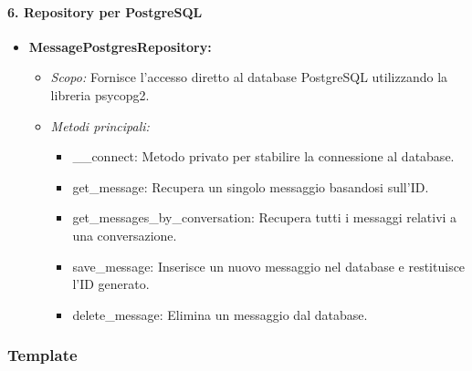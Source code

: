     \paragraph{6. Repository per PostgreSQL}
    \begin{itemize}
        \item \textbf{MessagePostgresRepository:}
        \begin{itemize}
            \item \textit{Scopo:} Fornisce l’accesso diretto al database PostgreSQL utilizzando la libreria psycopg2.
            \item \textit{Metodi principali:}
            \begin{itemize}
                \item \_\_connect: Metodo privato per stabilire la connessione al database.
                \item get\_message: Recupera un singolo messaggio basandosi sull’ID.
                \item get\_messages\_by\_conversation: Recupera tutti i messaggi relativi a una conversazione.
                \item save\_message: Inserisce un nuovo messaggio nel database e restituisce l’ID generato.
                \item delete\_message: Elimina un messaggio dal database.
            \end{itemize}
        \end{itemize}
    \end{itemize}

    \subsubsection{Template}

